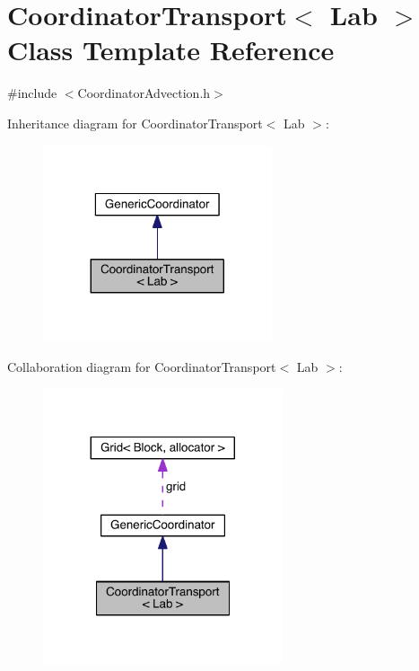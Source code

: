 \hypertarget{class_coordinator_transport}{}\section{Coordinator\+Transport$<$ Lab $>$ Class Template Reference}
\label{class_coordinator_transport}


{\ttfamily \#include $<$Coordinator\+Advection.\+h$>$}



Inheritance diagram for Coordinator\+Transport$<$ Lab $>$\+:\nopagebreak
\begin{figure}[H]
\begin{center}
\leavevmode
\includegraphics[width=191pt]{df/def/class_coordinator_transport__inherit__graph}
\end{center}
\end{figure}


Collaboration diagram for Coordinator\+Transport$<$ Lab $>$\+:\nopagebreak
\begin{figure}[H]
\begin{center}
\leavevmode
\includegraphics[width=200pt]{d9/d19/class_coordinator_transport__coll__graph}
\end{center}
\end{figure}
